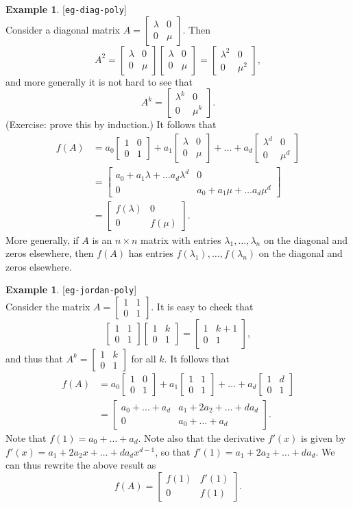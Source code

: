 \documentclass{amsart}
\newcommand{\lbl}[1]{\label{#1}\textup{[\texttt{#1}]}\ \\}
\newcommand{\lbl}{\label}
\newcommand{\bbm}       {\left[\begin{matrix}}
\newcommand{\bsm}       {\left[\begin{smallmatrix}}
\newcommand{\ebm}       {\end{matrix}\right]}
\newcommand{\esm}       {\end{smallmatrix}\right]}
\newcommand{\lm}        {\lambda}
\newcommand{\tm}        {\times}
\renewcommand{\:}{\colon}
\theoremstyle{definition}
\newtheorem{example}[theorem]{Example}
\begin{document}
\begin{example}\lbl{eg-diag-poly}
 Consider a diagonal matrix $A=\bsm \lm & 0\\0&\mu\esm$.  Then 
 \[ A^2 = \bbm \lm & 0\\0&\mu\ebm\bbm \lm & 0\\0&\mu\ebm
        = \bbm \lm^2 & 0\\0&\mu^2\ebm,
 \]
 and more generally it is not hard to see that 
 \[ A^k = \bbm \lm^k & 0\\0&\mu^k \ebm . \]
 (Exercise: prove this by induction.)  It follows that
 \begin{align*}
  f(A) &= a_0\bbm 1     & 0 \\ 0 & 1     \ebm +
          a_1\bbm \lm   & 0 \\ 0 & \mu   \ebm + \ldots +
          a_d\bbm \lm^d & 0 \\ 0 & \mu^d \ebm \\
       &= \bbm a_0 + a_1\lm + \ldots a_d\lm^d & 0 \\
               0 & a_0 + a_1\mu + \ldots a_d\mu^d \ebm \\
       &= \bbm f(\lm) & 0 \\ 0 & f(\mu) \ebm.
 \end{align*}
 More generally, if $A$ is an $n\tm n$ matrix with entries
 $\lm_1,\ldots,\lm_n$ on the diagonal and zeros elsewhere, then $f(A)$
 has entries $f(\lm_1),\ldots,f(\lm_n)$ on the diagonal and zeros
 elsewhere.  
\end{example}
\begin{example}\lbl{eg-jordan-poly}
 Consider the matrix $A=\bsm 1&1\\0&1\esm$.  It is easy to check that 
 \[ \bbm 1 & 1\\0 & 1\ebm \bbm 1 & k\\0 & 1 \ebm = 
    \bbm 1 & k+1 \\ 0 & 1 \ebm,
 \]
 and thus that $A^k=\bsm 1&k\\0&1\esm$ for all $k$.  It follows that 
 \begin{align*}
  f(A) &= a_0\bbm 1&0\\0&1\ebm + 
          a_1\bbm 1&1\\0&1\ebm + \ldots + 
          a_d\bbm 1&d\\0&1\ebm \\
       &= \bbm a_0+\ldots+a_d & a_1 + 2a_2+\ldots+da_d \\
               0 & a_0+\ldots+a_d \ebm.
 \end{align*}
 Note that $f(1)=a_0+\ldots+a_d$.  Note also that the derivative
 $f'(x)$ is given by $f'(x)=a_1+2a_2x+\ldots+da_dx^{d-1}$, so that
 $f'(1)=a_1+2a_2+\ldots+da_d$.  We can thus rewrite the above result
 as 
 \[ f(A) = \bbm f(1) & f'(1) \\ 0 & f(1) \ebm. \]
\end{example}
\end{document}

